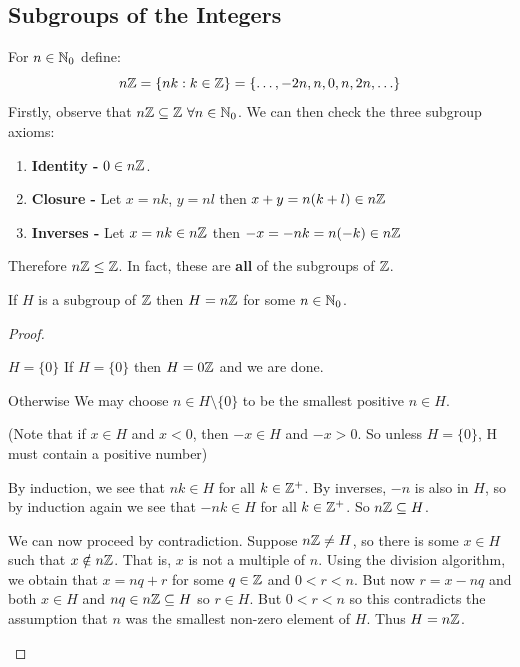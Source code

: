 \documentclass[../main.tex]{subfiles}
\begin{document}
\subsection{Subgroups of the Integers}
\begin{example}
  For $n \in \mathbb{N}_0$ define:
  \[
    n\mathbb{Z} = \{nk : k \in \mathbb{Z}\} = \{\ldots, -2n, n, 0, n, 2n, \ldots\}
  \]
  Firstly, observe that $n\mathbb{Z} \subseteq \mathbb{Z}\ \forall n \in \mathbb{N}_0$.
  We can then check the three subgroup axioms:
  \begin{enumerate}
    \item \textbf{Identity -} $0 \in n\mathbb{Z}$.
    \item \textbf{Closure -} Let $x = nk$, $y = nl$ then $x + y = n(k + l) \in n\mathbb{Z}$
    \item \textbf{Inverses -} Let $x = nk \in n\mathbb{Z}$ then $-x = -nk = n(-k) \in n\mathbb{Z}$
  \end{enumerate}
  Therefore $n\mathbb{Z} \leq \mathbb{Z}$.
  In fact, these are \textbf{all} of the subgroups of $\mathbb{Z}$.
\end{example}
\begin{proposition}
  If $H$ is a subgroup of $\mathbb{Z}$ then $H = n\mathbb{Z}$ for some $n \in \mathbb{N}_0$.
\end{proposition}
\begin{proof}
  \begin{proofcases}
    \begin{case}{$H = \{0\}$}
      If $H = \{0\}$ then $H = 0\mathbb{Z}$ and we are done.
    \end{case}
    \begin{case}{Otherwise}
      We may choose $n \in H \setminus \{0\}$ to be the smallest positive $n \in H$.

      (Note that if $x \in H$ and $x < 0$, then $-x \in H$ and $-x > 0$. So unless $H = \{0\}$, H must contain a positive number)

      By induction, we see that $nk \in H$ for all $k \in \mathbb{Z}^{+}$.
      By inverses, $-n$ is also in $H$, so by induction again we see that $-nk \in H$ for all $k \in \mathbb{Z}^{+}$.
      So $n\mathbb{Z} \subseteq H$.

      We can now proceed by contradiction.
      Suppose $n\mathbb{Z} \neq H$, so there is some $x \in H$ such that $x \notin n\mathbb{Z}$.
      That is, $x$ is not a multiple of $n$.
      Using the division algorithm, we obtain that $x = nq + r$ for some $q \in \mathbb{Z}$ and $0 < r < n$.
      But now $r = x - nq$ and both $x \in H$ and $nq \in n\mathbb{Z} \subseteq H$ so $r \in H$.
      But $0 < r < n$ so this contradicts the assumption that $n$ was the smallest non-zero element of $H$.
      Thus $H = n\mathbb{Z}$.
    \end{case}
  \end{proofcases}
\end{proof}
\end{document}
